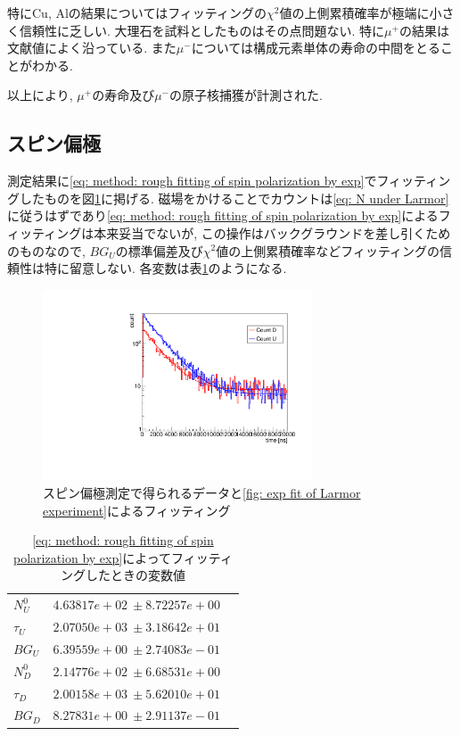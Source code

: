 \documentclass[dvipdfmx]{jsarticle}
\begin{document}
特にCu, Alの結果についてはフィッティングの$\chi^2$値の上側累積確率が極端に小さく信頼性に乏しい.
大理石を試料としたものはその点問題ない.
特に$\mu^+$の結果は文献値によく沿っている.
また$\mu^-$については構成元素単体の寿命の中間をとることがわかる.

以上により, $\mu^+$の寿命及び$\mu^-$の原子核捕獲が計測された.


\subsection{スピン偏極}

測定結果に\eqref{eq: method: rough fitting of spin polarization by exp}でフィッティングしたものを図\ref{fig: exp fit of Larmor experiment}に掲げる.
磁場をかけることでカウントは\eqref{eq: N under Larmor}に従うはずであり\eqref{eq: method: rough fitting of spin polarization by exp}によるフィッティングは本来妥当でないが, この操作はバックグラウンドを差し引くためのものなので, $BG_U$の標準偏差及び$\chi^2$値の上側累積確率などフィッティングの信頼性は特に留意しない.
各変数は表\ref{table: result: parameters of result with B fit with exp}のようになる.

\begin{figure}
    \centering
    \includegraphics[width=8cm]{../img/results/expFit.pdf}
    \caption{スピン偏極測定で得られるデータと\eqref{fig: exp fit of Larmor experiment}によるフィッティング}
    \label{fig: exp fit of Larmor experiment}
\end{figure}

\begin{table}
    \centering
    \caption{\eqref{eq: method: rough fitting of spin polarization by exp}によってフィッティングしたときの変数値}
    \begin{tabular}[]{lrr}
        \toprule
        $N_U^0$ & $4.63817e+02\:\pm8.72257e+00$
        \\
        $\tau_U$ & $2.07050e+03\:\pm3.18642e+01$
        \\
        $BG_U$ & $6.39559e+00\:\pm2.74083e-01$
        \\
        \midrule
        $N_D^0$ & $2.14776e+02\:\pm6.68531e+00$
        \\
        $\tau_D$ & $2.00158e+03\:\pm5.62010e+01$
        \\
        $BG_D$ & $8.27831e+00\:\pm2.91137e-01$
        \\
        \bottomrule
    \end{tabular}
    \label{table: result: parameters of result with B fit with exp}
\end{table}
\end{document}
